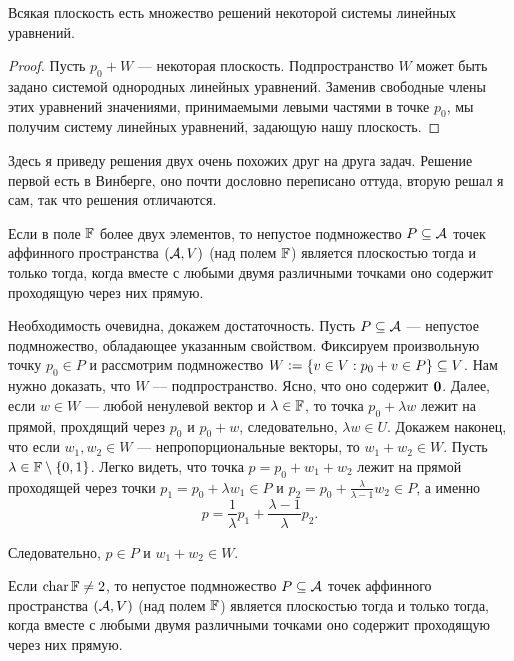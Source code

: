 \begin{theorem}
    Всякая плоскость есть множество решений некоторой системы линейных уравнений.
\end{theorem}

\begin{proof}
    Пусть $p_0 + W$ --- некоторая плоскость. Подпространство $W$ может быть задано системой однородных линейных уравнений. Заменив свободные члены этих уравнений значениями, принимаемыми левыми частями в точке $p_0$, мы получим систему линейных уравнений, задающую нашу плоскость.
\end{proof}

Здесь я приведу решения двух очень похожих друг на друга задач. Решение первой есть в Винберге, оно почти дословно переписано оттуда, вторую решал я сам, так что решения отличаются.

\begin{problem}[Из Винберга]
    Если в поле $\mathbb{F}$ более двух элементов, то непустое подмножество $P \subseteq \mathcal{A}$ точек аффинного пространства $(\mathcal{A}, V)$ (над полем $\mathbb{F}$) является плоскостью тогда и только тогда, когда вместе с любыми двумя различными точками оно содержит проходящую через них прямую.
\end{problem}

\begin{solution}
    Необходимость очевидна, докажем достаточность. Пусть $P \subseteq \mathcal{A}$ --- непустое подмножество, обладающее указанным свойством. Фиксируем произвольную точку $p_0 \in P$ и рассмотрим подмножество $W \vcentcolon = \{v \in V : p_0 + v \in P\} \subseteq V$. Нам нужно доказать, что $W$ --- подпространство. Ясно, что оно содержит $\boldsymbol{0}$. Далее, если $w \in W$ --- любой ненулевой вектор и $\lambda \in \mathbb{F}$, то точка $p_0 + \lambda w$ лежит на прямой, прохдящий через $p_0$ и $p_0 + w$, следовательно, $\lambda w \in U$. Докажем наконец, что если $w_1, w_2 \in W$ --- непропорциональные векторы, то $w_1 + w_2 \in W$. Пусть $\lambda \in \mathbb{F} \setminus \{0, 1\}$. Легко видеть, что точка $p = p_0 + w_1 + w_2$ лежит на прямой проходящей через точки $p_1 = p_0 + \lambda w_1 \in P$ и $p_2 = p_0 + \frac{\lambda}{\lambda - 1}w_2 \in P$, а именно
    \[
        p = \frac{1}{\lambda}p_1 + \frac{\lambda - 1}{\lambda}p_2.
    \]

    Следовательно, $p \in P$ и $w_1 + w_2 \in W$.
\end{solution}

\begin{problem}[А.\,А. Клячко]
    Если $\operatorname{char}\mathbb{F} \ne 2$, то непустое подмножество $P \subseteq \mathcal{A}$ точек аффинного пространства $(\mathcal{A}, V)$ (над полем $\mathbb{F}$) является плоскостью тогда и только тогда, когда вместе с любыми двумя различными точками оно содержит проходящую через них прямую.
\end{problem}

